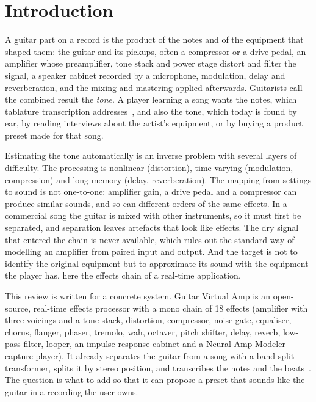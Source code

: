 \section{Introduction}
\label{sec:intro}

A guitar part on a record is the product of the notes and of the equipment
that shaped them: the guitar and its pickups, often a compressor or a drive
pedal, an amplifier whose preamplifier, tone stack and power stage distort and
filter the signal, a speaker cabinet recorded by a microphone, modulation,
delay and reverberation, and the mixing and mastering applied afterwards.
Guitarists call the combined result the \emph{tone}. A player learning a song
wants the notes, which tablature transcription addresses~\cite{deangelo2026tabreview},
and also the tone, which today is found by ear, by reading interviews about
the artist's equipment, or by buying a product preset made for that song.

Estimating the tone automatically is an inverse problem with several layers
of difficulty. The processing is nonlinear (distortion), time-varying
(modulation, compression) and long-memory (delay, reverberation). The
mapping from settings to sound is not one-to-one: amplifier gain, a drive
pedal and a compressor can produce similar sounds, and so can different
orders of the same effects. In a commercial song the guitar is mixed with
other instruments, so it must first be separated, and separation leaves
artefacts that look like effects. The dry signal that entered the chain is
never available, which rules out the standard way of modelling an amplifier
from paired input and output. And the target is not to identify the original
equipment but to approximate its sound with the equipment the player has,
here the effects chain of a real-time application.

This review is written for a concrete system. Guitar Virtual Amp is an
open-source, real-time effects processor with a mono chain of 18 effects
(amplifier with three voicings and a tone stack, distortion, compressor,
noise gate, equaliser, chorus, flanger, phaser, tremolo, wah, octaver, pitch
shifter, delay, reverb, low-pass filter, looper, an impulse-response cabinet
and a Neural Amp Modeler capture player). It already separates the guitar from
a song with a band-split transformer, splits it by stereo position, and
transcribes the notes and the beats~\cite{deangelo2026tabreview}. The question
is what to add so that it can propose a preset that sounds like the guitar in
a recording the user owns.

